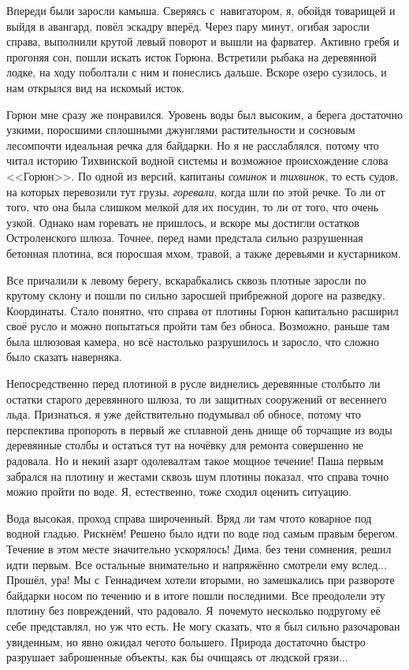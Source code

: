 Впереди были заросли камыша. Сверяясь с~навигатором, я, обойдя товарищей и выйдя в авангард, повёл эскадру вперёд. Через пару минут, огибая заросли справа, выполнили крутой левый поворот и вышли на фарватер. Активно гребя и прогоняя сон, пошли искать исток Горюна. Встретили рыбака на деревянной лодке, на ходу поболтали с ним и понеслись дальше. Вскоре озеро сузилось, и нам открылся вид на искомый исток.

Горюн мне сразу же понравился. Уровень воды был высоким, а берега достаточно узкими, поросшими сплошными джунглями растительности и сосновым лесом\mdash почти идеальная речка для байдарки. Но я не расслаблялся, потому что читал историю Тихвинской водной системы и возможное происхождение слова <<Горюн>>. По одной из версий, капитаны \textit{соминок} и \textit{тихвинок}, то есть судов, на которых перевозили тут грузы, \textit{горевали}, когда шли по этой речке. То ли от того, что она была слишком мелкой для их посудин, то ли от того, что очень узкой. Однако нам горевать не пришлось, и вскоре мы достигли остатков Остроленского шлюза. Точнее, перед нами предстала сильно разрушенная бетонная плотина, вся поросшая мхом, травой, а также деревьями и кустарником.  

Все причалили к левому берегу, вскарабкались сквозь плотные заросли по крутому склону и пошли по сильно заросшей прибрежной дороге на разведку. Координаты\mdash \CoordsGorunSixteenPlotina. Стало понятно, что справа от плотины Горюн капитально расширил своё русло и можно попытаться пройти там без обноса. Возможно, раньше там была шлюзовая камера, но всё настолько разрушилось и заросло, что сложно было сказать наверняка. 

Непосредственно перед плотиной в русле виднелись деревянные столбы\mdash то ли остатки старого деревянного шлюза, то ли защитных сооружений от весеннего льда. Признаться, я уже действительно подумывал об обносе, потому что перспектива пропороть в первый же сплавной день днище об торчащие из воды деревянные столбы и остаться тут на ночёвку для ремонта совершенно не радовала. Но и некий азарт одолевал\mdash там такое мощное течение! Паша первым забрался на плотину и жестами сквозь шум плотины показал, что справа точно можно пройти по воде. Я, естественно, тоже сходил оценить ситуацию. 

Вода высокая, проход справа широченный. Вряд ли там что\sdash то коварное под водной гладью. Рискнём! Решено было идти по воде под самым правым берегом. Течение в этом месте значительно ускорялось! Дима, без тени сомнения, решил идти первым. Все остальные внимательно и напряжённо смотрели ему вслед$\ldots$ Прошёл, ура! Мы с~Геннадичем хотели вторыми, но замешкались при развороте байдарки носом по течению и в итоге пошли последними. Все преодолели эту плотину без повреждений, что радовало. Я~почему\sdash то несколько по\sdash другому её себе представлял, но уж что есть. Не могу сказать, что я был сильно разочарован увиденным, но явно ожидал чего\sdash то большего. Природа достаточно быстро разрушает заброшенные объекты, как бы очищаясь от людской грязи$\ldots$

